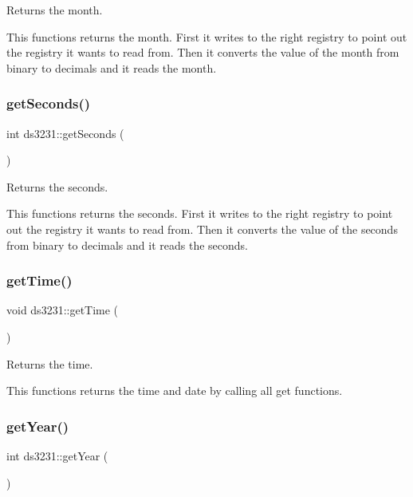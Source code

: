 Returns the month. 

This functions returns the month. First it writes to the right registry to point out the registry it wants to read from. Then it converts the value of the month from binary to decimals and it reads the month. \mbox{\label{classds3231_acf29728b7e035fb3ca09ad9ef8f769d1}} 
\subsubsection{\texorpdfstring{get\+Seconds()}{getSeconds()}}
{\footnotesize\ttfamily int ds3231\+::get\+Seconds (\begin{DoxyParamCaption}{ }\end{DoxyParamCaption})\hspace{0.3cm}{\ttfamily [inline]}}



Returns the seconds. 

This functions returns the seconds. First it writes to the right registry to point out the registry it wants to read from. Then it converts the value of the seconds from binary to decimals and it reads the seconds. \mbox{\label{classds3231_a01dbcd7b91ec0f810dd477b16b58031b}} 
\subsubsection{\texorpdfstring{get\+Time()}{getTime()}}
{\footnotesize\ttfamily void ds3231\+::get\+Time (\begin{DoxyParamCaption}{ }\end{DoxyParamCaption})\hspace{0.3cm}{\ttfamily [inline]}}



Returns the time. 

This functions returns the time and date by calling all get functions. \mbox{\label{classds3231_a32991ca3c1e1242a8316cd08df22b63d}} 
\subsubsection{\texorpdfstring{get\+Year()}{getYear()}}
{\footnotesize\ttfamily int ds3231\+::get\+Year (\begin{DoxyParamCaption}{ }\end{DoxyParamCaption})\hspace{0.3cm}{\ttfamily [inline]}}



